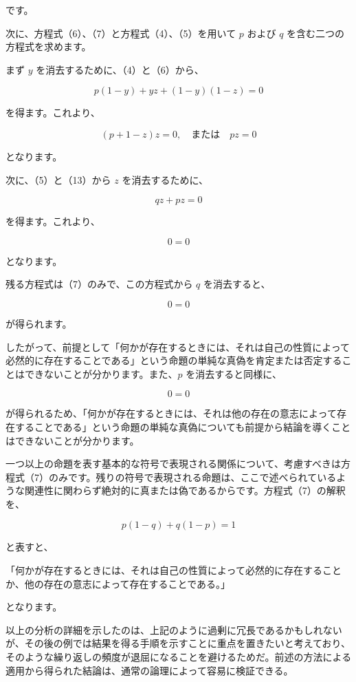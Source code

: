 \documentclass[a4paper,11pt,openany]{ltjsbook}
\begin{document}
です。

次に、方程式（6）、（7）と方程式（4）、（5）を用いて $p$ および $q$ を含む二つの方程式を求めます。

まず $y$ を消去するために、（4）と（6）から、

\[
p(1 - y) + yz + (1 - y)(1 - z) = 0
\]

を得ます。これより、

\begin{equation}
(p + 1 - z)z = 0, \quad \text{または} \quad pz = 0
\end{equation}

となります。

次に、（5）と（13）から $z$ を消去するために、

\[
qz + pz = 0
\]

を得ます。これより、

\[
0 = 0
\]

となります。

残る方程式は（7）のみで、この方程式から $q$ を消去すると、

\begin{equation}
0 = 0
\end{equation}

が得られます。

したがって、前提として「何かが存在するときには、それは自己の性質によって必然的に存在することである」という命題の単純な真偽を肯定または否定することはできないことが分かります。また、$p$ を消去すると同様に、

\begin{equation}
0 = 0
\end{equation}

が得られるため、「何かが存在するときには、それは他の存在の意志によって存在することである」という命題の単純な真偽についても前提から結論を導くことはできないことが分かります。

一つ以上の命題を表す基本的な符号で表現される関係について、考慮すべきは方程式（7）のみです。残りの符号で表現される命題は、ここで述べられているような関連性に関わらず絶対的に真または偽であるからです。方程式（7）の解釈を、

\[
p(1 - q) + q(1 - p) = 1
\]

と表すと、

「何かが存在するときには、それは自己の性質によって必然的に存在することか、他の存在の意志によって存在することである。」

となります。

以上の分析の詳細を示したのは、上記のように過剰に冗長であるかもしれないが、その後の例では結果を得る手順を示すことに重点を置きたいと考えており、そのような繰り返しの頻度が退屈になることを避けるためだ。前述の方法による適用から得られた結論は、通常の論理によって容易に検証できる。
\end{document}
